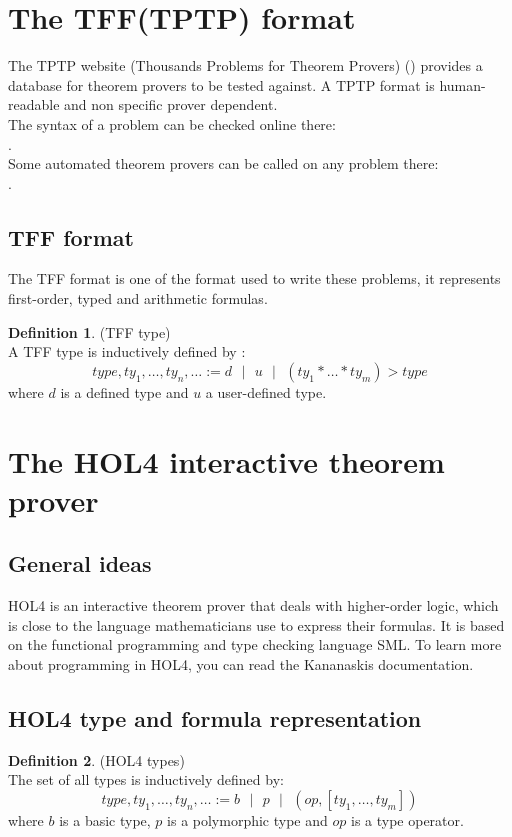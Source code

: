 \documentclass[a4paper, 11pt]{article}
\theoremstyle{plain}
\theoremstyle{definition}
\newtheorem*{mydef}{Definition}
\theoremstyle{remark}
\newcommand\sep{\mbox{ } | \mbox{ }}
\begin{document}
\section{The TFF(TPTP) format}
The TPTP website (Thousands Problems for Theorem Provers) () provides a database for theorem provers to be tested against. A TPTP format is human-readable and non specific prover dependent. 
\\The syntax of a problem can be checked online there: \\. 
\\Some automated theorem provers can be called on any problem there: \\.

\subsection{TFF format}
The TFF format is one of the format used to write these problems, it represents first-order, typed and arithmetic formulas. 
\begin{mydef} (TFF type)
\\A TFF type is inductively defined by :
\[type,ty_1,\ldots,ty_n,\ldots := d \sep u \sep (ty_1 * \ldots * ty_m) > type\]
where $d$ is a defined type and $u$ a user-defined type.
\end{mydef}



\section{The HOL4 interactive theorem prover}
\subsection{General ideas}
HOL4 is an interactive theorem prover that deals with higher-order logic, which is close to the language mathematicians use to express their formulas. It is based on the functional programming and type checking language SML. To learn more about programming in HOL4, you can read the Kananaskis documentation.
 
\subsection{HOL4 type and formula representation}
   
\begin{mydef} (HOL4 types)
\\The set of all types is inductively defined by:
 \[type,ty_1,\ldots,ty_n,\ldots := b \sep p \sep (op,[ty_1,\ldots,ty_m])\] 
where $b$ is a basic type, $p$ is a polymorphic type and $op$  is a type operator.
\end{mydef}
 
\end{document}
